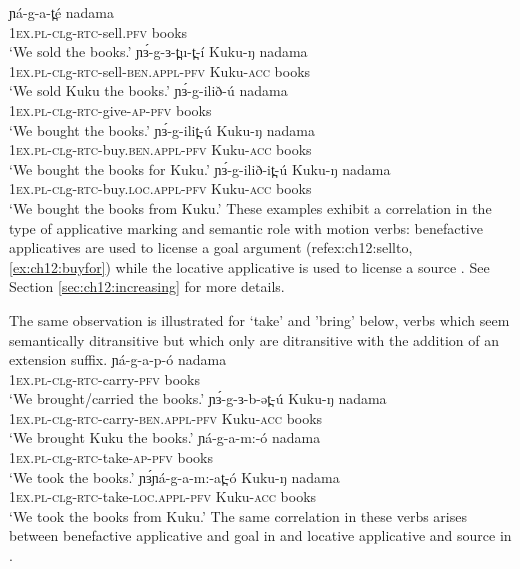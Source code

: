 \ea \ea \gll ɲá-g-a-t̪é nadama\\
 		\textsc{1ex.pl-cl}g-\textsc{rtc-}sell.\textsc{pfv}  books\\
		\glt ‘We sold the books.’ 
	\ex \gll ɲɜ́-g-ɜ-t̪u-t̪-í Kuku-ŋ nadama\\
 		\textsc{1ex.pl-cl}g-\textsc{rtc-}sell-\textsc{ben.appl-pfv} Kuku-\textsc{acc} books\\
		\glt ‘We sold Kuku the books.’\label{ex:ch12:sellto} %
	\z
\ex \ea \gll ɲɜ́-g-ilið-ú nadama\\
 		\textsc{1ex.pl-cl}g-\textsc{rtc-}give-\textsc{ap-pfv} books\\
		\glt ‘We bought the books.’
	\ex \gll ɲɜ́-g-ilit̪-ú Kuku-ŋ nadama\\
 		\textsc{1ex.pl-cl}g-\textsc{rtc-}buy.\textsc{ben.appl}-\textsc{pfv} Kuku-\textsc{acc} books\\
		\glt ‘We bought the books for Kuku.’ \label{ex:ch12:buyfor}
	\ex \gll ɲɜ́-g-ilið-it̪-ú Kuku-ŋ nadama\\
 		\textsc{1ex.pl-cl}g-\textsc{rtc-}buy.\textsc{loc.appl}-\textsc{pfv} Kuku-\textsc{acc} books\\
		\glt ‘We bought the books from Kuku.’ \label{ex:ch12:buyfrom}
	\z
\z 
These examples exhibit a correlation in the type of applicative marking and semantic role with motion verbs: benefactive applicatives are used to license a goal argument (ref{ex:ch12:sellto}, \ref{ex:ch12:buyfor}) while the locative applicative is used to license a source . See Section \ref{sec:ch12:increasing} for more details. 

The same observation is illustrated for `take' and 'bring' below, verbs which seem semantically ditransitive but which only are ditransitive with the addition of an extension suffix.
\ea \ea \gll ɲá-g-a-p-ó nadama\\
 		\textsc{1ex.pl-cl}g-\textsc{rtc-}carry-\textsc{pfv}  books\\
		\glt ‘We brought/carried the books.’ 
	\ex \gll ɲɜ́-g-ɜ-b-ət̪-ú Kuku-ŋ nadama\\
 		\textsc{1ex.pl-cl}g-\textsc{rtc-}carry-\textsc{ben.appl-pfv} Kuku-\textsc{acc} books\\
		\glt ‘We brought Kuku the books.’ \label{ex:ch12:bringto}
	\z
\ex \ea \gll ɲá-g-a-m:-ó nadama\\
 		\textsc{1ex.pl-cl}g-\textsc{rtc-}take-\textsc{ap-pfv} books\\
		\glt ‘We took the books.’
	\ex \gll ɲɜ́ɲá-g-a-m:-at̪-ó Kuku-ŋ nadama\\
 		\textsc{1ex.pl-cl}g-\textsc{rtc-}take-\textsc{loc.appl}-\textsc{pfv} Kuku-\textsc{acc} books\\
		\glt ‘We took the books from Kuku.’ \label{ex:ch12:takefrom}
	\z
\z 
The same correlation in these verbs arises between benefactive applicative and goal in  and locative applicative and source in .


